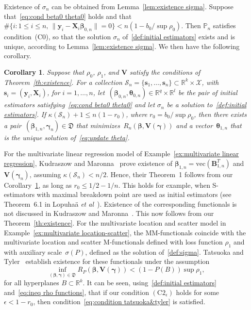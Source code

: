 \documentclass{article}
\numberwithin{equation}{section}
\theoremstyle{plain}
\newtheorem{corollary}{Corollary}
\newcommand{\R}{\mathbb{R}}
\newcommand{\vc}{\mathrm{vec}}
\newcommand{\bbeta}{\bm\beta}
\newcommand{\btheta}{\bm\theta}
\newcommand{\bgamma}{\bm\gamma}
\newcommand{\by}{\mathbf{y}}
\newcommand{\bs}{\mathbf{s}}
\newcommand{\bX}{\mathbf{X}}
\newcommand{\bV}{\mathbf{V}}
\newcommand{\bB}{\mathbf{B}}
\begin{document}
Existence of $\sigma_n$ can be obtained from Lemma~\ref{lem:existence sigma}.
Suppose that~\eqref{eq:cond beta0 theta0} holds and 
that~$\#\{i: 1\leq i\leq n,\, 
\|\by_i-\bX_i\bbeta_{0,n}\|=0
\}
<n(1-b_0/\sup\rho_0)$.
Then $\mathbb{P}_n$ satisfies condition~(C0), so that the solution $\sigma_n$ of~\eqref{def:initial estimators}
exists and is unique, according to Lemma~\ref{lem:existence sigma}.
We then have the following corollary.
\begin{corollary}
\label{cor:existence estimator structured}
Suppose that $\rho_0$, $\rho_1$, and $\bV$ satisfy the conditions of Theorem~\ref{th:existence}.
For a collection $\mathcal{S}_n=\{\bs_1,\ldots,\bs_n\}\subset\R^k\times \mathcal{X}$,
with $\bs_i=(\by_i,\bX_i)$, for $i=1,\ldots,n$, 
let~$(\bbeta_{0,n},\btheta_{0,n})\in\R^{q}\times\R^l$ be the pair of initial estimators
satisfying~\eqref{eq:cond beta0 theta0} and let $\sigma_n$ be a solution to~\eqref{def:initial estimators}.
If $\kappa(\mathcal{S}_n)+1\leq n(1-r_0)$, where $r_0=b_0/\sup\rho_0$,
then there exists a pair~$(\bbeta_{1,n},\bgamma_n)\in \mathfrak{D}$ that minimizes~$R_n(\bbeta,\bV(\bgamma))$
and a vector~$\btheta_{1,n}$ that is the unique solution of~\eqref{eq:update theta}.
\end{corollary}
For the multivariate linear regression model of Example~\ref{ex:multivariate linear regression},
Kudraszow and Maronna~\cite{kudraszow-maronna2011} prove existence of $\bbeta_{1,n}=\vc(\bB_{1,n}^T)$
and $\bV(\bgamma_n)$, assuming $\kappa(\mathcal{S}_n)<n/2$.
Hence, their Theorem~1 follows from our Corollary~\ref{cor:existence estimator structured},
as long as $r_0\leq1/2-1/n$.
This holds for example, when S-estimators with maximal breakdown point are used as initial estimators
(see Theorem~6.1 in Lopuha\"a \textit{et al}~\cite{lopuhaa-gares-ruizgazen2023}).
Existence of the corresponding functionals is not discussed in Kudraszow and Maronna~\cite{kudraszow-maronna2011}.
This now follows from our Theorem~\ref{th:existence}.
For the multivariate location and scatter model in Example~\ref{ex:multivariate location-scatter}, 
the MM-functionals coincide with the multivariate location and scatter M-functionals defined
with loss function $\rho_1$ and with auxiliary scale~$\sigma(P)$,
defined as the solution of~\eqref{def:sigma}. 
Tatsuoka and Tyler~\cite{tatsuoka&tyler2000} establish existence for these functionals
under the assumption
\begin{equation}
\label{eq:condition tatsuoka&tyler}
\inf_{(\bbeta,\bgamma)\in \mathfrak{D}}
R_P(\bbeta,\bV(\bgamma))
<
(1-P(B))\sup\rho_1,
\end{equation}
for all hyperplanes $B\subset\R^k$.
It can be seen, using~\eqref{def:initial estimators} and~\eqref{eq:ineq rho functions}, that if our condition $(\text{C2}_\epsilon)$ holds for some $\epsilon<1-r_0$, 
then condition~\eqref{eq:condition tatsuoka&tyler} is satisfied.
\end{document}

